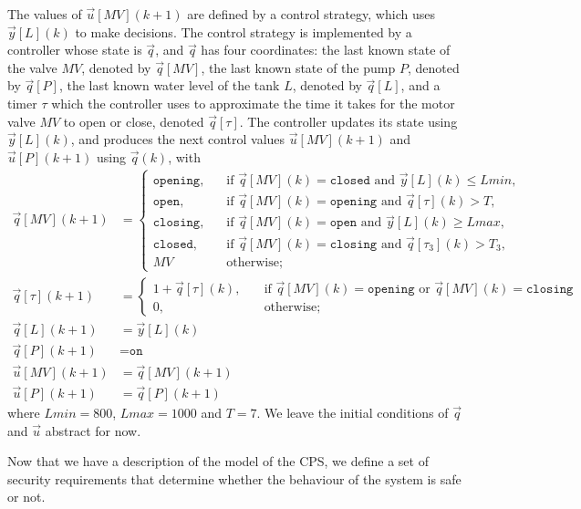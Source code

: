 The values of $\vec{u}[MV](k+1)$ are defined by a control strategy, which uses $\vec{y}[L](k)$ to make decisions. The control strategy is implemented by a controller whose state is $\vec{q}$, and $\vec{q}$ has four coordinates: the last known state of the valve $MV$, denoted by $\vec{q}[MV]$, the last known state of the pump $P$, denoted by $\vec{q}[P]$, the last known water level of the tank $L$, denoted by $\vec{q}[L]$,  and a timer $\tau$ which the controller uses to approximate the time it takes for the motor valve $MV$ to open or close, denoted $\vec{q}[\tau]$. 
The controller updates its state using $\vec{y}[L](k)$, and produces the next control values $\vec{u}[MV](k+1)$ and $\vec{u}[P](k+1)$ using $\vec{q}(k)$, with 
\begin{align}
  \label{eq:ControllerStager3}
  \vec{q}[MV](k+1)&=
  \begin{cases}
    \texttt{opening},&\quad \text{if $\vec{q}[MV](k)=\texttt{closed}$ and $\vec{y}[L](k)\leq Lmin$,}\\
    \texttt{open},&\quad \text{if $\vec{q}[MV](k)=\texttt{opening}$ and $\vec{q}[\tau](k)>T$,}\\
    \texttt{closing},&\quad \text{if $\vec{q}[MV](k)=\texttt{open}$ and $\vec{y}[L](k)\geq Lmax$,}\\
    \texttt{closed},&\quad \text{if $\vec{q}[MV](k)=\texttt{closing}$ and $\vec{q}[\tau_3](k) >T_3$,}\\
    MV&\quad \text{otherwise;}    
  \end{cases}\\
  \vec{q}[\tau](k+1)&=
\begin{cases}
  1+\vec{q}[\tau](k), &\quad \text{if $\vec{q}[MV](k)=\texttt{opening}$ or $\vec{q}[MV](k)=\texttt{closing}$}\\
  0,&\quad \text{otherwise;}    
\end{cases}\\
\vec{q}[L](k+1)&=\vec{y}[L](k)\\
\vec{q}[P](k+1)&=\texttt{on}\\
\vec{u}[MV](k+1)&=\vec{q}[MV](k+1)\\
\vec{u}[P](k+1)&=\vec{q}[P](k+1)
\end{align}
where $Lmin=800$, $Lmax=1000$ and $T=7$. We leave the initial conditions of $\vec{q}$ and $\vec{u}$ abstract for now.

Now that we have a description of the model of the CPS, we define a set of security requirements that determine whether the behaviour of the system is safe or not.

